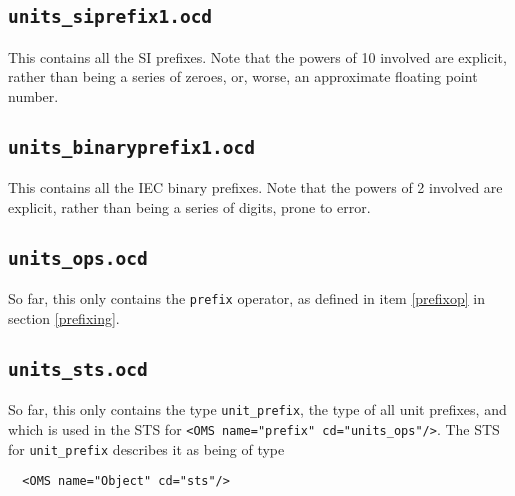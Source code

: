 \documentclass[11pt]{openmathTN}
\begin{document}
\subsection{{\tt units\_siprefix1.ocd}}
This contains all the SI prefixes. Note
that the powers of 10 involved are explicit, rather than being a series of
zeroes, or, worse, an approximate floating point number.
\subsection{{\tt units\_binaryprefix1.ocd}}
This contains all the IEC binary prefixes. Note
that the powers of 2 involved are explicit, rather than being a series of
digits, prone to error.
\subsection{{\tt units\_ops.ocd}}
So far, this only contains the {\tt prefix} operator, as defined in item
\ref{prefixop} in section \ref{prefixing}.
\subsection{{\tt units\_sts.ocd}}
So far, this only contains the type {\tt unit\_prefix}, the type of all unit
prefixes, and which is used in the STS for
\verb+<OMS name="prefix" cd="units_ops"/>+. The STS for {\tt unit\_prefix}
describes it as being of type
\begin{verbatim}
  <OMS name="Object" cd="sts"/>
\end{verbatim}
\end{document}
